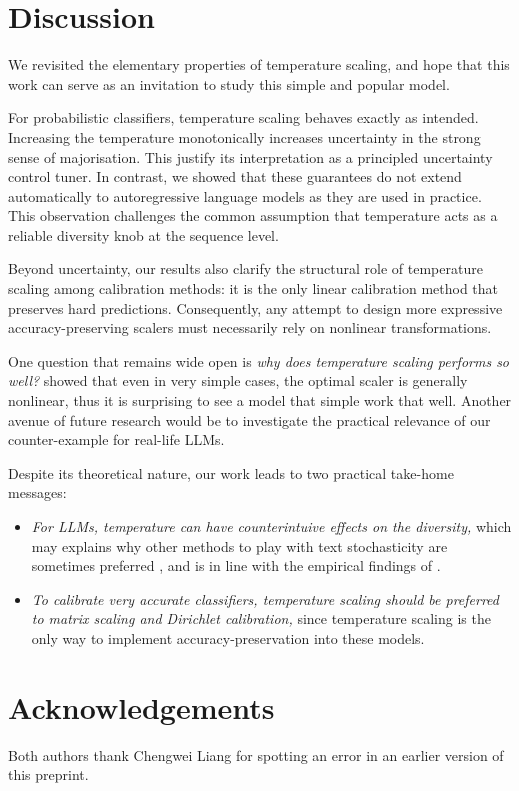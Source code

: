 \documentclass[10pt,dvipsnames]{article}
\theoremstyle{plain}
\theoremstyle{definition}
\theoremstyle{remark}
\begin{document}
\section{Discussion}
\label{sec:discussion}
We revisited the elementary properties of temperature scaling, and hope that this work can serve as an invitation to study this simple and popular model.

For probabilistic classifiers, temperature scaling behaves exactly as intended. Increasing the temperature monotonically increases uncertainty in the strong sense of majorisation. This justify its interpretation as a principled uncertainty control tuner. In contrast, we showed that these guarantees do not extend automatically to autoregressive language models as they are used in practice. This observation challenges the common assumption that temperature acts as a reliable diversity knob at the sequence level.

Beyond uncertainty, our results also clarify the structural role of temperature scaling among calibration methods: it is the only linear calibration method that preserves hard predictions. Consequently, any attempt to design more expressive accuracy-preserving scalers must necessarily rely on nonlinear transformations.

One question that remains wide open is \emph{why does temperature scaling performs so well?} \citet{berta2025structured} showed that even in very simple cases, the optimal scaler is generally nonlinear, thus it is surprising to see a model that simple work that well.
Another avenue of future research would be to investigate the practical relevance of our counter-example for real-life LLMs.

Despite its theoretical nature, our work leads to two practical take-home messages:
\begin{itemize}
    \item \emph{For LLMs, temperature can have counterintuive effects on the diversity,} which may explains why other methods to play with text stochasticity are sometimes preferred \citep{holtzman2020curious}, and is in line with the empirical findings of \citet{peeperkorn2024temperature}.
    \item \emph{To calibrate very accurate classifiers, temperature scaling should be preferred to matrix scaling and Dirichlet calibration,} since temperature scaling is the only way to implement accuracy-preservation into these models.
\end{itemize}

\section*{Acknowledgements}
Both authors thank Chengwei Liang for spotting an error in an earlier version of this preprint.
\end{document}
